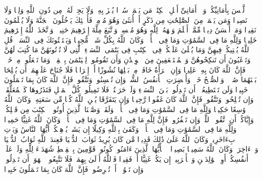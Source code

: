 \stopbuffer%
\startbuffer[\q:4:123]
لَّیۡسَ بِأَمَانِیِّكُمۡ وَلَاۤ أَمَانِیِّ أَهۡلِ ٱلۡكِتَٰبِۗ مَن یَعۡمَلۡ سُوۤءࣰا یُجۡزَ بِهِۦ وَلَا یَجِدۡ لَهُۥ مِن دُونِ ٱللَّهِ وَلِیࣰّا وَلَا نَصِیرࣰا%
\stopbuffer%
\startbuffer[\q:4:124]
وَمَن یَعۡمَلۡ مِنَ ٱلصَّٰلِحَٰتِ مِن ذَكَرٍ أَوۡ أُنثَىٰ وَهُوَ مُؤۡمِنࣱ فَأُو۟لَٰۤئِكَ یَدۡخُلُونَ ٱلۡجَنَّةَ وَلَا یُظۡلَمُونَ نَقِیرࣰا%
\stopbuffer%
\startbuffer[\q:4:125]
وَمَنۡ أَحۡسَنُ دِینࣰا مِّمَّنۡ أَسۡلَمَ وَجۡهَهُۥ لِلَّهِ وَهُوَ مُحۡسِنࣱ وَٱتَّبَعَ مِلَّةَ إِبۡرَٰهِیمَ حَنِیفࣰاۗ وَٱتَّخَذَ ٱللَّهُ إِبۡرَٰهِیمَ خَلِیلࣰا%
\stopbuffer%
\startbuffer[\q:4:126]
وَلِلَّهِ مَا فِی ٱلسَّمَٰوَٰتِ وَمَا فِی ٱلۡأَرۡضِۚ وَكَانَ ٱللَّهُ بِكُلِّ شَیۡءࣲ مُّحِیطࣰا%
\stopbuffer%
\startbuffer[\q:4:127]
وَیَسۡتَفۡتُونَكَ فِی ٱلنِّسَاۤءِۖ قُلِ ٱللَّهُ یُفۡتِیكُمۡ فِیهِنَّ وَمَا یُتۡلَىٰ عَلَیۡكُمۡ فِی ٱلۡكِتَٰبِ فِی یَتَٰمَى ٱلنِّسَاۤءِ ٱلَّٰتِی لَا تُؤۡتُونَهُنَّ مَا كُتِبَ لَهُنَّ وَتَرۡغَبُونَ أَن تَنكِحُوهُنَّ وَٱلۡمُسۡتَضۡعَفِینَ مِنَ ٱلۡوِلۡدَٰنِ وَأَن تَقُومُوا۟ لِلۡیَتَٰمَىٰ بِٱلۡقِسۡطِۚ وَمَا تَفۡعَلُوا۟ مِنۡ خَیۡرࣲ فَإِنَّ ٱللَّهَ كَانَ بِهِۦ عَلِیمࣰا%
\stopbuffer%
\startbuffer[\q:4:128]
وَإِنِ ٱمۡرَأَةٌ خَافَتۡ مِنۢ بَعۡلِهَا نُشُوزًا أَوۡ إِعۡرَاضࣰا فَلَا جُنَاحَ عَلَیۡهِمَاۤ أَن یُصۡلِحَا بَیۡنَهُمَا صُلۡحࣰاۚ وَٱلصُّلۡحُ خَیۡرࣱۗ وَأُحۡضِرَتِ ٱلۡأَنفُسُ ٱلشُّحَّۚ وَإِن تُحۡسِنُوا۟ وَتَتَّقُوا۟ فَإِنَّ ٱللَّهَ كَانَ بِمَا تَعۡمَلُونَ خَبِیرࣰا%
\stopbuffer%
\startbuffer[\q:4:129]
وَلَن تَسۡتَطِیعُوۤا۟ أَن تَعۡدِلُوا۟ بَیۡنَ ٱلنِّسَاۤءِ وَلَوۡ حَرَصۡتُمۡۖ فَلَا تَمِیلُوا۟ كُلَّ ٱلۡمَیۡلِ فَتَذَرُوهَا كَٱلۡمُعَلَّقَةِۚ وَإِن تُصۡلِحُوا۟ وَتَتَّقُوا۟ فَإِنَّ ٱللَّهَ كَانَ غَفُورࣰا رَّحِیمࣰا%
\stopbuffer%
\startbuffer[\q:4:130]
وَإِن یَتَفَرَّقَا یُغۡنِ ٱللَّهُ كُلࣰّا مِّن سَعَتِهِۦۚ وَكَانَ ٱللَّهُ وَٰسِعًا حَكِیمࣰا%
\stopbuffer%
\startbuffer[\q:4:131]
وَلِلَّهِ مَا فِی ٱلسَّمَٰوَٰتِ وَمَا فِی ٱلۡأَرۡضِۗ وَلَقَدۡ وَصَّیۡنَا ٱلَّذِینَ أُوتُوا۟ ٱلۡكِتَٰبَ مِن قَبۡلِكُمۡ وَإِیَّاكُمۡ أَنِ ٱتَّقُوا۟ ٱللَّهَۚ وَإِن تَكۡفُرُوا۟ فَإِنَّ لِلَّهِ مَا فِی ٱلسَّمَٰوَٰتِ وَمَا فِی ٱلۡأَرۡضِۚ وَكَانَ ٱللَّهُ غَنِیًّا حَمِیدࣰا%
\stopbuffer%
\startbuffer[\q:4:132]
وَلِلَّهِ مَا فِی ٱلسَّمَٰوَٰتِ وَمَا فِی ٱلۡأَرۡضِۚ وَكَفَىٰ بِٱللَّهِ وَكِیلًا%
\stopbuffer%
\startbuffer[\q:4:133]
إِن یَشَأۡ یُذۡهِبۡكُمۡ أَیُّهَا ٱلنَّاسُ وَیَأۡتِ بِءَاخَرِینَۚ وَكَانَ ٱللَّهُ عَلَىٰ ذَٰلِكَ قَدِیرࣰا%
\stopbuffer%
\startbuffer[\q:4:134]
مَّن كَانَ یُرِیدُ ثَوَابَ ٱلدُّنۡیَا فَعِندَ ٱللَّهِ ثَوَابُ ٱلدُّنۡیَا وَٱلۡءَاخِرَةِۚ وَكَانَ ٱللَّهُ سَمِیعَۢا بَصِیرࣰا%
\stopbuffer%
\startbuffer[\q:4:135]
۞ یَٰۤأَیُّهَا ٱلَّذِینَ ءَامَنُوا۟ كُونُوا۟ قَوَّٰمِینَ بِٱلۡقِسۡطِ شُهَدَاۤءَ لِلَّهِ وَلَوۡ عَلَىٰۤ أَنفُسِكُمۡ أَوِ ٱلۡوَٰلِدَیۡنِ وَٱلۡأَقۡرَبِینَۚ إِن یَكُنۡ غَنِیًّا أَوۡ فَقِیرࣰا فَٱللَّهُ أَوۡلَىٰ بِهِمَاۖ فَلَا تَتَّبِعُوا۟ ٱلۡهَوَىٰۤ أَن تَعۡدِلُوا۟ۚ وَإِن تَلۡوُۥۤا۟ أَوۡ تُعۡرِضُوا۟ فَإِنَّ ٱللَّهَ كَانَ بِمَا تَعۡمَلُونَ خَبِیرࣰا%
